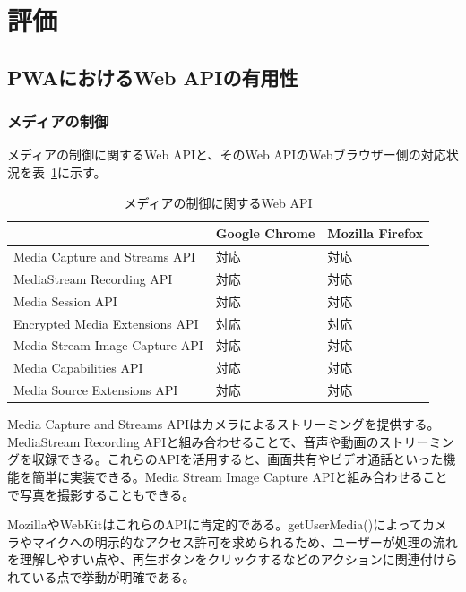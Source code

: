 \section{評価}\label{section:評価}
\subsection{PWAにおけるWeb APIの有用性}\label{subsection:PWAにおけるWeb APIの有用性}
\subsubsection{メディアの制御}\label{subsubsection:メディアの制御}
メディアの制御に関するWeb APIと、そのWeb APIのWebブラウザー側の対応状況を表~\ref{table:メディアの制御に関するWeb API}に示す。
\begin{table}
  \caption{メディアの制御に関するWeb API}\label{table:メディアの制御に関するWeb API}
  \centering
  \begin{tabular}{|p{20em}|p{10em}|p{10em}|}
    \hline
    & Google Chrome & Mozilla Firefox \\ \hline
    Media Capture and Streams API & 対応 & 対応 \\ \hline
    MediaStream Recording API & 対応 & 対応 \\ \hline
    Media Session API & 対応 & 対応 \\ \hline
    Encrypted Media Extensions API & 対応 & 対応 \\ \hline
    Media Stream Image Capture API & 対応 & 対応 \\ \hline
    Media Capabilities API & 対応 & 対応 \\ \hline
    Media Source Extensions API & 対応 & 対応 \\ \hline
  \end{tabular}
\end{table}
Media Capture and Streams APIはカメラによるストリーミングを提供する。MediaStream Recording APIと組み合わせることで、音声や動画のストリーミングを収録できる。これらのAPIを活用すると、画面共有やビデオ通話といった機能を簡単に実装できる。Media Stream Image Capture APIと組み合わせることで写真を撮影することもできる。

MozillaやWebKitはこれらのAPIに肯定的である。getUserMedia()によってカメラやマイクへの明示的なアクセス許可を求められるため、ユーザーが処理の流れを理解しやすい点や、再生ボタンをクリックするなどのアクションに関連付けられている点で挙動が明確である。

